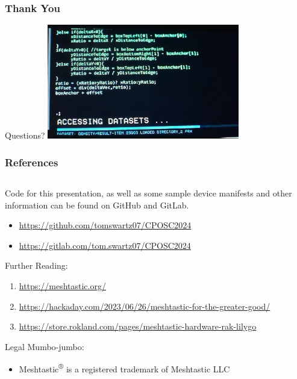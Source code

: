 \documentclass[aspectratio=169]{beamer}
\begin{document}
\begin{frame}
  \frametitle{Thank You}
  \begin{center}
    \LARGE{Questions?}
    \vfill{}
    \includegraphics[height=5cm]{images/lol-code.jpg}
  \end{center}
\end{frame}
\begin{frame}
  \frametitle{References}
  \begin{columns}[]
    \begin{column}[T]{0.55\paperwidth}
      Code for this presentation, as well as some sample device manifests and other
      information can be found on GitHub and GitLab.
      \begin{itemize}
        \item{\href{https://github.com/tomswartz07/CPOSC2024}{https://github.com/tomswartz07/CPOSC2024}}
        \item{\href{https://gitlab.com/tom.swartz07/CPOSC2024}{https://gitlab.com/tom.swartz07/CPOSC2024}}
      \end{itemize}
      \vfill{}
      Further Reading:
      \begin{enumerate}
        \item{\href{https://meshtastic.org/}{https://meshtastic.org/}}
        \item{\href{https://hackaday.com/2023/06/26/meshtastic-for-the-greater-good/}{https://hackaday.com/2023/06/26/meshtastic-for-the-greater-good/}}
        \item{\href{https://store.rokland.com/pages/meshtastic-hardware-rak-lilygo}{https://store.rokland.com/pages/meshtastic-hardware-rak-lilygo}}
      \end{enumerate}
      \tiny{Legal Mumbo-jumbo:}
      \vfill{}
      \begin{itemize}
        \item{\tiny{Meshtastic\textsuperscript{\textsf{®}} is a registered trademark of Meshtastic LLC}}
      \end{itemize}
    \end{column}
    \begin{column}[T]{0.35\paperwidth}
    \end{column}
  \end{columns}
\end{frame}
\end{document}
